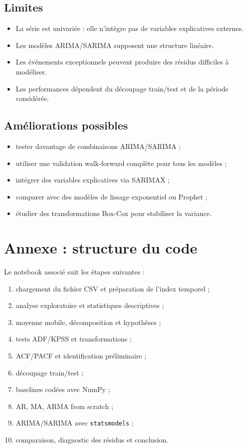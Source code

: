 \documentclass[12pt,a4paper]{report}
\begin{document}
\section{Limites}
\begin{itemize}
    \item La série est univariée : elle n'intègre pas de variables explicatives externes.
    \item Les modèles ARIMA/SARIMA supposent une structure linéaire.
    \item Les événements exceptionnels peuvent produire des résidus difficiles à modéliser.
    \item Les performances dépendent du découpage train/test et de la période considérée.
\end{itemize}

\section{Améliorations possibles}
\begin{itemize}
    \item tester davantage de combinaisons ARIMA/SARIMA ;
    \item utiliser une validation walk-forward complète pour tous les modèles ;
    \item intégrer des variables explicatives via SARIMAX ;
    \item comparer avec des modèles de lissage exponentiel ou Prophet ;
    \item étudier des transformations Box-Cox pour stabiliser la variance.
\end{itemize}

\chapter*{Annexe : structure du code}
Le notebook associé suit les étapes suivantes :
\begin{enumerate}
    \item chargement du fichier CSV et préparation de l'index temporel ;
    \item analyse exploratoire et statistiques descriptives ;
    \item moyenne mobile, décomposition et hypothèses ;
    \item tests ADF/KPSS et transformations ;
    \item ACF/PACF et identification préliminaire ;
    \item découpage train/test ;
    \item baselines codées avec NumPy ;
    \item AR, MA, ARMA from scratch ;
    \item ARIMA/SARIMA avec \texttt{statsmodels} ;
    \item comparaison, diagnostic des résidus et conclusion.
\end{enumerate}
\end{document}
